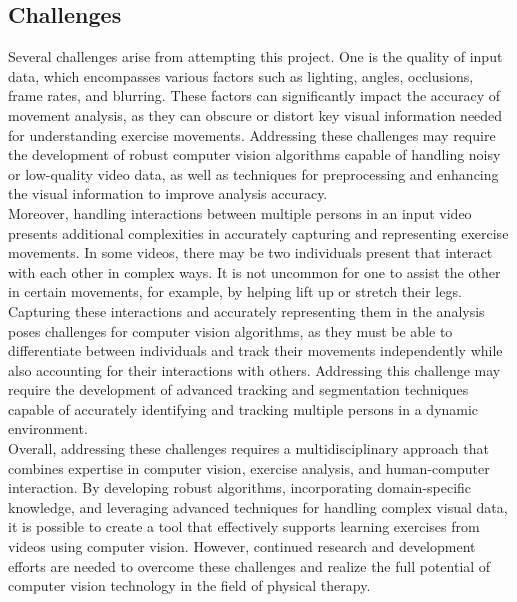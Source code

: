 \subsection{Challenges}
\indent Several challenges arise from attempting this project. One is the quality of input data, which 
encompasses various factors such as lighting, angles, occlusions, frame rates, and blurring. These 
factors can significantly impact the accuracy of movement analysis, as they can obscure or distort 
key visual information needed for understanding exercise movements. Addressing these challenges may 
require the development of robust computer vision algorithms capable of handling noisy or low-quality 
video data, as well as techniques for preprocessing and enhancing the visual information to improve 
analysis accuracy.
\\
\indent Moreover, handling interactions between multiple persons in an input video presents additional 
complexities in accurately capturing and representing exercise movements. In some videos, 
there may be two individuals present that interact with each other in complex ways. It is not uncommon for  
one to assist the other in certain movements, for example, by helping lift up or stretch their legs. 
Capturing these interactions and accurately representing them in the analysis poses challenges for 
computer vision algorithms, as they must be able to differentiate between individuals 
and track their movements independently while also accounting for their interactions with others. 
Addressing this challenge may require the development of advanced tracking and segmentation techniques 
capable of accurately identifying and tracking multiple persons in a dynamic environment.
\\
\indent Overall, addressing these challenges requires a multidisciplinary approach that combines expertise 
in computer vision, exercise analysis, and human-computer interaction. By developing robust algorithms, 
incorporating domain-specific knowledge, and leveraging advanced techniques for handling complex 
visual data, it is possible to create a tool that effectively supports learning exercises from  
videos using computer vision. However, continued research and development efforts are needed to 
overcome these challenges and realize the full potential of computer vision technology in the 
field of physical therapy.

